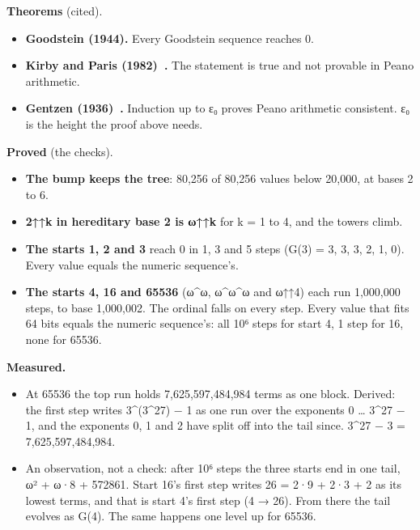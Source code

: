 \textbf{Theorems} (cited).

\begin{itemize}
\item \textbf{Goodstein (1944).} Every Goodstein sequence reaches 0.
\item \textbf{Kirby and Paris (1982)~\cite{src:Kirby-and-Paris-1982}.} The statement is true and not provable in Peano arithmetic.
\item \textbf{Gentzen (1936)~\cite{src:Gentzen-1936}.} Induction up to ε₀ proves Peano arithmetic consistent. ε₀ is the height the proof above needs.
\end{itemize}

\textbf{Proved} (the checks).

\begin{itemize}
\item \textbf{The bump keeps the tree}: 80,256 of 80,256 values below 20,000, at bases 2 to 6.
\item \textbf{2↑↑k in hereditary base 2 is ω↑↑k} for k = 1 to 4, and the towers climb.
\item \textbf{The starts 1, 2 and 3} reach 0 in 1, 3 and 5 steps (G(3) = 3, 3, 3, 2, 1, 0). Every value equals the numeric sequence's.
\item \textbf{The starts 4, 16 and 65536} (ω\textasciicircum{}ω, ω\textasciicircum{}ω\textasciicircum{}ω and ω↑↑4) each run 1,000,000 steps, to base 1,000,002. The ordinal falls on every step. Every value that fits 64 bits equals the numeric sequence's: all 10⁶ steps for start 4, 1 step for 16, none for 65536.
\end{itemize}

\textbf{Measured.}

\begin{itemize}
\item At 65536 the top run holds 7,625,597,484,984 terms as one block. Derived: the first step writes 3\textasciicircum{}(3\textasciicircum{}27) − 1 as one run over the exponents 0 … 3\textasciicircum{}27 − 1, and the exponents 0, 1 and 2 have split off into the tail since. 3\textasciicircum{}27 − 3 = 7,625,597,484,984.
\item An observation, not a check: after 10⁶ steps the three starts end in one tail, ω² + ω·8 + 572861. Start 16's first step writes 26 = 2·9 + 2·3 + 2 as its lowest terms, and that is start 4's first step (4 → 26). From there the tail evolves as G(4). The same happens one level up for 65536.
\end{itemize}

